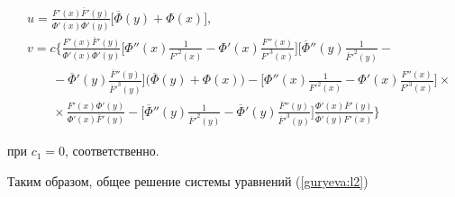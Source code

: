 \begin{equation}


\label{guryeva:j12}


\begin{aligned}


& u=


 \frac{F'(x)\overline{F}'(y)}{\Phi'(x)\overline{\Phi}'(y)}


\bigl[\overline{\Phi}(y)+\Phi(x)\bigr],


\\


& v=c\bigg\{


 \frac{F'(x)\overline{F}'(y)}{\Phi'(x)\overline{\Phi}'(y)}


\biggl[


\Phi''(x)\frac{1}{{F'}^{2}(x)} -\Phi' (x)\frac{F''(x)}{{F'}^{3}(x)}\biggr]








\biggl[\overline{\Phi}''(y)\frac{1}{{\overline{F}'}^{2}(y)}-


\\


&\qquad - \overline{\Phi}' (y)\frac{\overline{F}''(y)}{{\overline{F}'}^{3}(y)}\biggr]


\bigl( \overline{\Phi}(y)+\Phi(x)\bigr)-


\biggl[ \Phi''(x) \frac{1}{{F'}^{2}(x)}-\Phi'(x) \frac{F''(x)}{{F' }^{3}(x)}\biggr] \times


\\


&\qquad \times  \frac{


 F'(x)\overline{\Phi}'(y)}{\Phi'(x)\overline{F}'(y)}-


\biggl[


\overline{\Phi}''(y) \frac{1}{{\overline{F}'}^{2}(y)}-


\overline{\Phi}'(y) \frac{\overline{F}''(y)}{{\overline{F}'}^{3}(y)}\biggr]


 \frac{\Phi'(x)\overline{F}'(y)}{\overline{\Phi}'(y)F'(x)}\bigg\}


\end{aligned}


\end{equation}


при $c_{1}=0$, соответственно.





Таким образом, общее решение системы уравнений (\ref{guryeva:l2})


